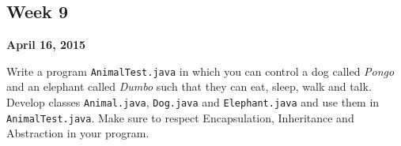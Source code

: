 \documentclass[12pt,letterpaper,twoside]{article}
\begin{document}


\subsection*{Week 9}
\hfill \textbf{April 16, 2015}

Write a program \texttt{AnimalTest.java} in which you can control a dog called \textit{Pongo} and an elephant called \textit{Dumbo} such that they can eat, sleep, walk and talk.
Develop classes \texttt{Animal.java}, \texttt{Dog.java} and \texttt{Elephant.java} and use them in \texttt{AnimalTest.java}.
Make sure to respect Encapsulation, Inheritance and Abstraction in your program.
\end{document}
